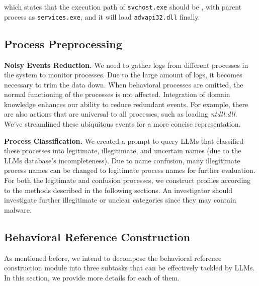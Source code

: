 which states that the execution path of \texttt{svchost.exe} should be , with parent process 
as \texttt{services.exe}, and it will load \texttt{advapi32.dll} finally.



\subsection{Process Preprocessing}
\noindent
{\bf Noisy Events Reduction.} 
We need to gather logs from different processes in the system to monitor processes.
Due to the large amount of logs, it becomes necessary to trim the data down. 
When behavioral processes are omitted, the normal functioning of the processes is not affected. Integration of domain knowledge enhances our ability to reduce redundant events. For example, there are also actions that are universal to all processes, such as loading \textit{ntdll.dll}. We've streamlined these ubiquitous events for a more concise representation.

\noindent
{\bf Process Classification.} \label{sec:classifition}
We created a prompt to query  LLMs that classified these processes into legitimate, illegitimate, and uncertain names (due to the LLMs database's incompleteness).
Due to name confusion, many illegitimate process names can be changed to legitimate process names for further evaluation.
For both the legitimate and confusion processes, we construct profiles according to the methods described in the following sections. An investigator should investigate further illegitimate or unclear categories since they may contain malware.

\subsection{Behavioral Reference Construction}
As mentioned before, we intend to decompose the behavioral reference construction module into three subtasks that can be effectively tackled by LLMs. In this section, we provide more details for each of them.
\label{sec:profile_con}



